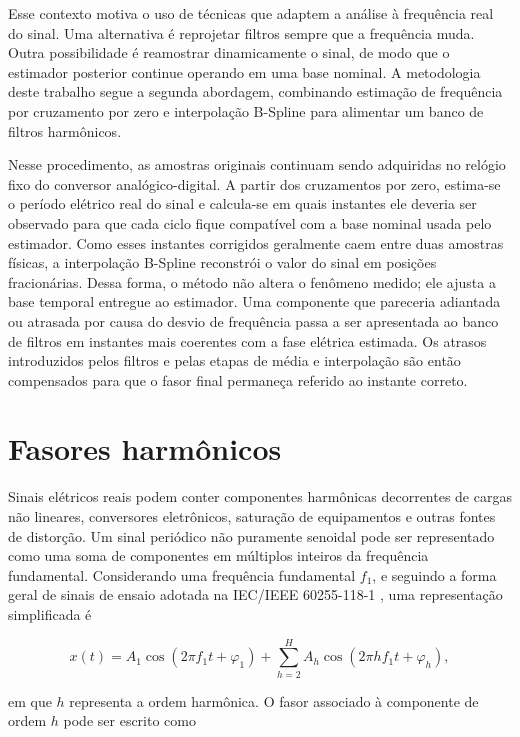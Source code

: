 Esse contexto motiva o uso de técnicas que adaptem a análise à frequência real do sinal. Uma alternativa é reprojetar filtros sempre que a frequência muda. Outra possibilidade é reamostrar dinamicamente o sinal, de modo que o estimador posterior continue operando em uma base nominal. A metodologia deste trabalho segue a segunda abordagem, combinando estimação de frequência por cruzamento por zero e interpolação B-Spline para alimentar um banco de filtros harmônicos.

Nesse procedimento, as amostras originais continuam sendo adquiridas no relógio fixo do conversor analógico-digital. A partir dos cruzamentos por zero, estima-se o período elétrico real do sinal e calcula-se em quais instantes ele deveria ser observado para que cada ciclo fique compatível com a base nominal usada pelo estimador. Como esses instantes corrigidos geralmente caem entre duas amostras físicas, a interpolação B-Spline reconstrói o valor do sinal em posições fracionárias. Dessa forma, o método não altera o fenômeno medido; ele ajusta a base temporal entregue ao estimador. Uma componente que pareceria adiantada ou atrasada por causa do desvio de frequência passa a ser apresentada ao banco de filtros em instantes mais coerentes com a fase elétrica estimada. Os atrasos introduzidos pelos filtros e pelas etapas de média e interpolação são então compensados para que o fasor final permaneça referido ao instante correto.

\section{Fasores harmônicos}\label{sec:fasores_harmonicos}

Sinais elétricos reais podem conter componentes harmônicas decorrentes de cargas não lineares, conversores eletrônicos, saturação de equipamentos e outras fontes de distorção. Um sinal periódico não puramente senoidal pode ser representado como uma soma de componentes em múltiplos inteiros da frequência fundamental. Considerando uma frequência fundamental $f_1$, e seguindo a forma geral de sinais de ensaio adotada na IEC/IEEE 60255-118-1 \cite{iec60255}, uma representação simplificada é

\begin{equation}
x(t) = A_1\cos(2\pi f_1t + \varphi_1)
+ \sum_{h=2}^{H} A_h\cos(2\pi hf_1t + \varphi_h),
\label{eq:cap2_sinal_harmonicos}
\end{equation}

\noindent em que $h$ representa a ordem harmônica. O fasor associado à componente de ordem $h$ pode ser escrito como

